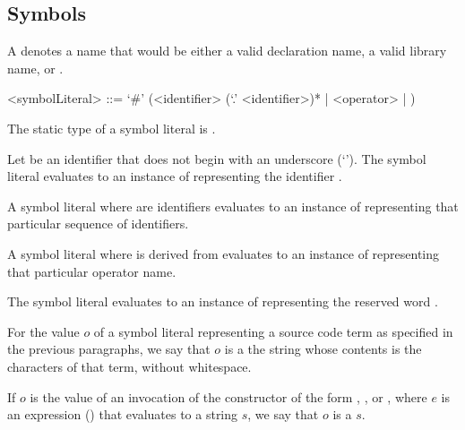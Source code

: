\documentclass[makeidx]{article}
\begin{document}
{\subsection{Symbols}

\LMHash{}%
A 
denotes a name that would be either
a valid declaration name, a valid library name, or \VOID.

\begin{grammar}
<symbolLiteral> ::=
  `#' (<identifier> (`.' <identifier>)* | <operator> | \VOID)
\end{grammar}

\LMHash{}%
The static type of a symbol literal is .

\LMHash{}%
Let \id{} be an identifier that does not begin with an underscore
(`\code{\_}').
The symbol literal \code{\#\id}
evaluates to an instance of 
representing the identifier \id.

\LMHash{}%
A symbol literal 
where  are identifiers
evaluates to an instance of 
representing that particular sequence of identifiers.

\LMHash{}%
A symbol literal 
where  is derived from 
evaluates to an instance of 
representing that particular operator name.

\LMHash{}%
The symbol literal 
evaluates to an instance of 
representing the reserved word \VOID.

\LMHash{}%
For the value $o$ of a symbol literal representing a source code term
as specified in the previous paragraphs, we say that $o$ is a
the string whose contents is the characters of that term, without whitespace.


\LMHash{}%
If $o$ is the value of an invocation of the  constructor
of the form
, ,
or ,
where $e$ is an expression
()
that evaluates to a string $s$,
we say that $o$ is a  $s$.

}
\end{document}
